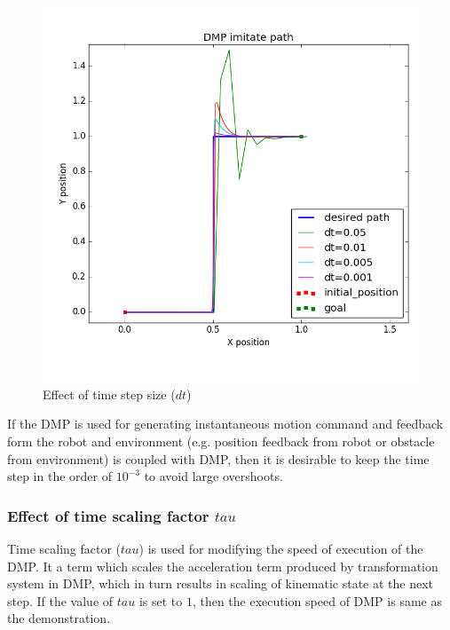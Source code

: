 \begin{figure}[H]
	\includegraphics[width=\textwidth]{images/dt_.png}
	\caption{Effect of time step size ($dt$)}
	\label{fig:dt_}
\end{figure}


If the DMP is used for generating instantaneous motion command and feedback form the robot and environment (e.g. position feedback from robot or obstacle from environment) is coupled with DMP, then it is desirable to keep the time step in the order of $10^{-3}$ to avoid large overshoots. 


\subsubsection{Effect of time scaling factor $tau$}   

Time scaling factor ($tau$) is used for modifying the speed of execution of the DMP. It a term which scales the acceleration term produced by transformation system in DMP, which in turn results in scaling of kinematic state at the next step. If the value of $tau$ is set to $1$, then the execution speed of DMP is same as the demonstration. 

